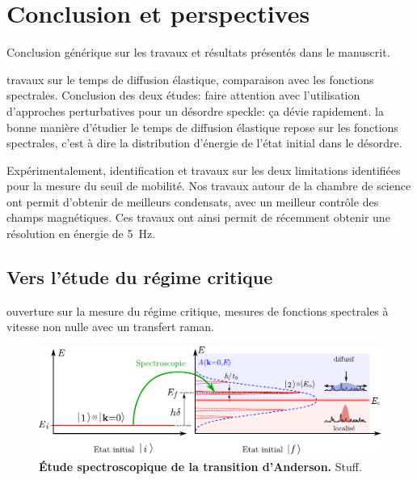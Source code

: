 
\chapter{Conclusion et perspectives}

Conclusion générique sur les travaux et résultats présentés dans le manuscrit.

travaux sur le temps de diffusion élastique, comparaison avec les fonctions spectrales. Conclusion des deux études: faire attention avec l'utilisation d'approches perturbatives pour un désordre speckle: ça dévie rapidement. la bonne manière d'étudier le temps de diffusion élastique repose sur les fonctions spectrales, c'est à dire la distribution d'énergie de l'état initial dans le désordre.


Expérimentalement, identification et travaux sur les deux limitations identifiées pour la mesure du seuil de mobilité. Nos travaux autour de la chambre de science ont permit d'obtenir de meilleurs condensats, avec un meilleur contrôle des champs magnétiques. Ces travaux ont ainsi permit de récemment obtenir une résolution en énergie de \SI{5}{\hertz}. 




\section{Vers l'étude du régime critique}
ouverture sur la mesure du régime critique, mesures de fonctions spectrales à vitesse non nulle avec un transfert raman. 
\citep{delande2014mobility}
\citep{pasek2017anderson}

\begin{figure}
\centering
\includegraphics[width=\textwidth]{Fig/Conclusion/spectro_transition_anderson.pdf}
\caption{\textbf{Étude spectroscopique de la transition d'Anderson.} Stuff.}
\label{fig:spectro_transition_anderson}
\end{figure}


